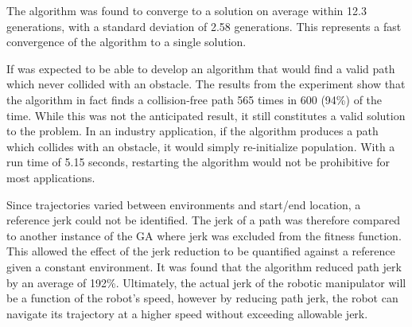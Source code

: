 The algorithm was found to converge to a solution on average within 12.3 generations, with a standard deviation of 2.58 generations. This represents a fast convergence of the algorithm to a single solution.

If was expected to be able to develop an algorithm that would find a valid path which never collided with an obstacle. The results from the experiment show that the algorithm in fact finds a collision-free path 565 times in 600 (94\%) of the time. While this was not the anticipated result, it still constitutes a valid solution to the problem. In an industry application, if the algorithm produces a path which collides with an obstacle, it would simply re-initialize population. With a run time of 5.15 seconds, restarting the algorithm would not be prohibitive for most applications.

Since trajectories varied between environments and start/end location, a reference jerk could not be identified. The jerk of a path was therefore compared to another instance of the GA where jerk was excluded from the fitness function. This allowed the effect of the jerk reduction to be quantified against a reference given a constant environment. It was found that the algorithm reduced path jerk by an average of 192\%. Ultimately, the actual jerk of the robotic manipulator will be a function of the robot's speed, however by reducing path jerk, the robot can navigate its trajectory at a higher speed without exceeding allowable jerk.